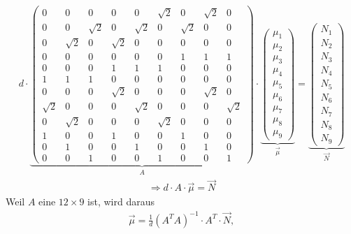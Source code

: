 \begin{align}
	d \cdot
	\underbrace{
	\begin{pmatrix}
		0 & 0 & 0  & 0 & 0 & \sqrt{2} & 0  & \sqrt{2} & 0\\
		 0&0  &\sqrt{2} & 0 & \sqrt{2} & 0 & \sqrt{2} & 0 & 0\\
		 0& \sqrt{2} & 0 & \sqrt{2} & 0 &0 &0  &0  &0 \\
		0&0 &0 &0 &0 &0 & 1 & 1 & 1\\
		0&0 &0 & 1 & 1 & 1 &0 &0 &0 \\
		1 & 1& 1 & 0&0 &0 &0 &0 &0\\
		0&0 &0 & \sqrt{2} & 0 &0 &0& \sqrt{2} &0\\
		\sqrt{2} & 0 & 0& 0 &\sqrt{2} &0 &0 &0 &\sqrt{2}\\
		0 & \sqrt{2} & 0 & 0 & 0 & \sqrt{2} & 0 & 0 &0\\
		1 &0 &0  &1 &0 &0 & 1 & 0 &0 \\
		0 & 1 & 0 & 0 & 1 & 0 & 0 & 1 &0 \\
		0 & 0& 1 & 0 & 0 & 1 & 0 & 0 & 1
	\end{pmatrix}
	}_{A}
	\cdot
	\underbrace{
	\begin{pmatrix}
		\mu_1\\
		\mu_2\\
		\mu_3\\
		\mu_4\\
		\mu_5\\
		\mu_6\\
		\mu_7\\
		\mu_8\\
		\mu_9
	\end{pmatrix}
	}_{\vec{\mu}}
	=
	\underbrace{
	\begin{pmatrix}
		N_1\\
		N_2\\
		N_3\\
		N_4\\
		N_5\\
		N_6\\
		N_7\\
		N_8\\
		N_9		
	\end{pmatrix}
	}_{\vec{N}}\nonumber
\end{align}
\begin{align}	
	\Rightarrow d \cdot A\cdot\vec{\mu}=\vec{N}
\end{align}
Weil $A$ eine $12\times 9 $ ist, wird daraus
\begin{align}
	\vec{\mu}=\frac{1}{d}\left(A^TA\right)^{-1}\cdot A^T\cdot\vec{N},
\end{align}
